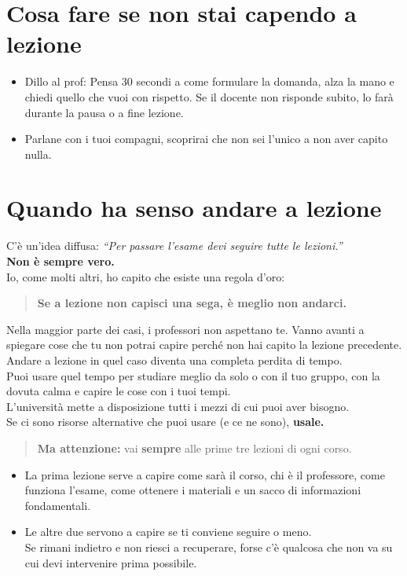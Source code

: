 \documentclass[18pt]{extarticle}
\begin{document}
\section{Cosa fare se non stai capendo a lezione}
\begin{itemize}
\item Dillo al prof: Pensa 30 secondi a come formulare la domanda, alza la mano e chiedi quello che vuoi con rispetto.  
  Se il docente non risponde subito, lo farà durante la pausa o a fine lezione.
\item Parlane con i tuoi compagni, scoprirai che non sei l'unico a non aver capito nulla.
\end{itemize}


\section{Quando ha senso andare a lezione}
C'è un'idea diffusa: \textit{``Per passare l'esame devi seguire tutte le lezioni.''}\\
\textbf{Non è sempre vero.}\\
Io, come molti altri, ho capito che esiste una regola d'oro:
\begin{quote}
\textbf{Se a lezione non capisci una sega, è meglio non andarci.}
\end{quote}
Nella maggior parte dei casi, i professori non aspettano te. Vanno avanti a spiegare cose che tu non potrai capire perché non hai capito la lezione precedente.\\
Andare a lezione in quel caso diventa una completa perdita di tempo.\\
Puoi usare quel tempo per studiare meglio da solo o con il tuo gruppo, con la dovuta calma e capire le cose con i tuoi tempi.\\
L'università mette a disposizione tutti i mezzi di cui puoi aver bisogno.\\
Se ci sono risorse alternative che puoi usare (e ce ne sono), \textbf{usale.}
\begin{quote}
\textbf{Ma attenzione:} vai \textbf{sempre} alle prime tre lezioni di ogni corso.
\end{quote}
\begin{itemize}
\item La prima lezione serve a capire come sarà il corso, chi è il professore, come funziona l'esame, come ottenere i materiali e un sacco di informazioni fondamentali.
\item Le altre due servono a capire se ti conviene seguire o meno.\\
   Se rimani indietro e non riesci a recuperare, forse c'è qualcosa che non va su cui devi intervenire prima possibile.
\end{itemize}
\end{document}
